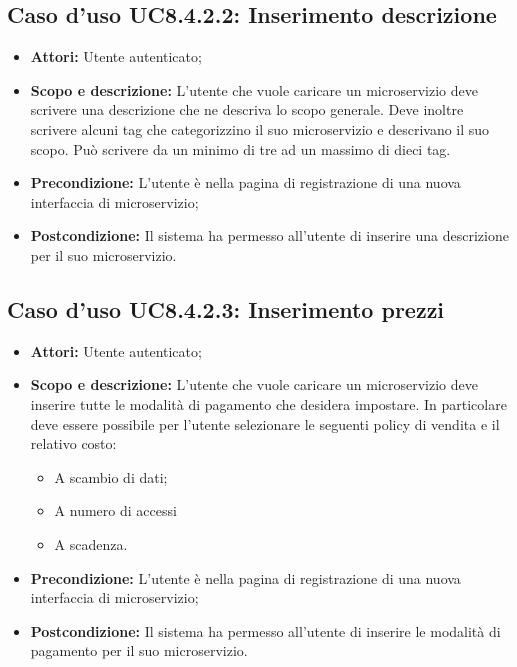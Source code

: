\documentclass[12pt,a4paper,titlepage]{article}
\begin{document}
	\subsection{Caso d'uso UC8.4.2.2: Inserimento descrizione}
	\label{UC8.4.2.2}
	\begin{itemize}
		\item \textbf{Attori: }Utente autenticato;
		\item \textbf{Scopo e descrizione: }L'utente che vuole caricare un microservizio deve scrivere una descrizione che ne descriva lo scopo generale. Deve inoltre scrivere alcuni tag che categorizzino il suo microservizio e descrivano il suo scopo. Può scrivere da un minimo di tre ad un massimo di dieci tag.
		\item \textbf{Precondizione: }L'utente è nella pagina di registrazione di una nuova interfaccia di microservizio;
		\item \textbf{Postcondizione: }Il sistema ha permesso all'utente di inserire una descrizione per il suo microservizio.
	\end{itemize}
	\subsection{Caso d'uso UC8.4.2.3: Inserimento prezzi}
	\label{UC8.4.2.3}
	\begin{itemize}
		\item \textbf{Attori: }Utente autenticato;
		\item \textbf{Scopo e descrizione: }L'utente che vuole caricare un microservizio deve inserire tutte le modalità di pagamento che desidera impostare. In particolare deve essere possibile per l'utente selezionare le seguenti policy di vendita e il relativo costo:
		\begin{itemize}
			\item A scambio di dati;
			\item A numero di accessi
			\item A scadenza.
		\end{itemize} 
		\item \textbf{Precondizione: }L'utente è nella pagina di registrazione di una nuova interfaccia di microservizio;
		\item \textbf{Postcondizione: }Il sistema ha permesso all'utente di inserire le modalità di pagamento per il suo microservizio.
	\end{itemize}
\end{document}
